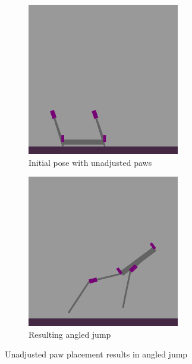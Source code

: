 \begin{figure}[h]
    \centering
    \begin{subfigure}[b]{0.48\textwidth}
        \centering
        \includegraphics[width=\textwidth]{Images/link_length_optimization/unadjusted_paw_pose.png}
        \caption{Initial pose with unadjusted paws}
    \end{subfigure}
    \hfill
    \begin{subfigure}[b]{0.48\textwidth}
        \centering
        \includegraphics[width=\textwidth]{Images/link_length_optimization/unadjusted_paw_jump.png}
        \caption{Resulting angled jump}
    \end{subfigure}
    \caption{Unadjusted paw placement results in angled jump}
    \label{fig:link_length_optimization:unadjusted_jump}
\end{figure}

